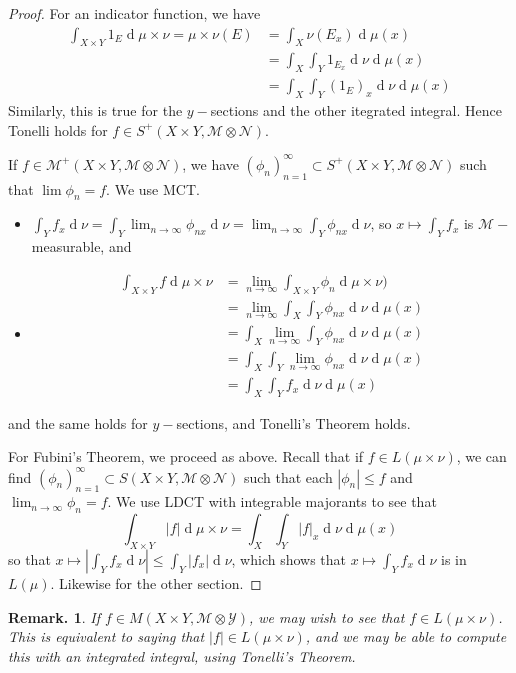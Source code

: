 \documentclass[12pt, a4paper]{memoir}
\theoremstyle{nonumberplain}
\newtheorem{remark}{Remark.}
\newtheorem{proof}{Proof}
\renewcommand{\d}[1]{\ensuremath{\operatorname{d}\!{#1}}} %
\begin{document}
\begin{proof}
    For an indicator function, we have
    \begin{align*}
        \int_{X\times Y}1_E\d{\mu\times\nu}=\mu\times\nu(E)&=\int_X\nu(E_x)\d{\mu(x)}\\
                                                           &=\int_X\int_Y1_{E_x}\d{\nu}\d{\mu(x)}\\
                                                           &= \int_X\int_Y(1_E)_x\d{\nu}\d{\mu(x)}
    \end{align*}
    Similarly, this is true for the $y-$sections and the other itegrated integral.
    Hence Tonelli holds for $f\in S^+(X\times Y,\mathcal{M}\otimes\mathcal{N})$.

    If $f\in\mathcal{M}^+(X\times Y,\mathcal{M}\otimes\mathcal{N})$, we have $(\phi_n)_{n=1}^\infty\subset S^+(X\times Y,\mathcal{M}\otimes\mathcal{N})$ such that $\lim\phi_n=f$.
    We use MCT.
    \begin{itemize}
        \item $\int_Y f_x\d{\nu}=\int_Y\lim_{n\to\infty}\phi_{nx}\d{\nu}=\lim_{n\to\infty}\int_Y\phi_{nx}\d{\nu}$, so $x\mapsto\int_Y f_x$ is $\mathcal{M}-$measurable, and
        \item
            \begin{align*}
                \int_{X\times Y}f\d{\mu\times\nu} &= \lim_{n\to\infty}\int_{X\times Y}\phi_n\d{\mu\times\nu)}\\
                                                  &= \lim_{n\to\infty}\int_X\int_Y\phi_{nx}\d{\nu}\d{\mu(x)}\\
                                                  &= \int_X\lim_{n\to\infty}\int_Y\phi_{nx}\d{\nu}\d{\mu(x)}\\
                                                  &= \int_X\int_Y\lim_{n\to\infty}\phi_{nx}\d{\nu}\d{\mu(x)}\\
                                                  &= \int_X\int_Y f_x\d{\nu}\d{\mu(x)}
            \end{align*}
    \end{itemize}
    and the same holds for $y-$sections, and Tonelli's Theorem holds.

    For Fubini's Theorem, we proceed as above.
    Recall that if $f\in L(\mu\times\nu)$, we can find $(\phi_n)_{n=1}^\infty\subset S(X\times Y,\mathcal{M}\otimes\mathcal{N})$ such that each $|\phi_n|\leq f$ and $\lim_{n\to\infty}\phi_n=f$.
    We use LDCT with integrable majorants to see that
    \begin{equation*}
        \int_{X\times Y}|f|\d{\mu\times\nu}=\int_X\int_Y|f|_x\d{\nu}\d{\mu(x)}
    \end{equation*}
    so that $x\mapsto\left\lvert\int_Yf_x\d{\nu}\right\rvert\leq\int_Y|f_x|\d{\nu}$, which shows that $x\mapsto\int_Yf_x\d{\nu}$ is in $L(\mu)$.
    Likewise for the other section.
\end{proof}
\begin{remark}
    If $f\in M(X\times Y,\mathcal{M}\otimes\mathcal{Y})$, we may wish to see that $f\in L(\mu\times\nu)$.
    This is equivalent to saying that $|f|\in L(\mu\times\nu)$, and we may be able to compute this with an integrated integral, using Tonelli's Theorem.
\end{remark}
\end{document}

